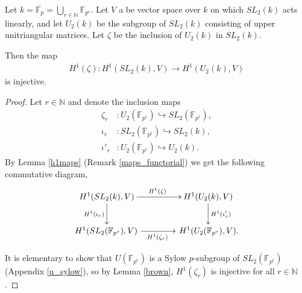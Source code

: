 \begin{example} \label{ab_example}
	Let $k = \overline{\mathbb{F}_p} = \bigcup_{r\in \mathbb{N}} \mathbb{F}_{p^r}$.
Let $V$ a be vector space over $k$ on which $SL_2(k)$ acts linearly, and let $U_2(k)$ be the subgroup of $SL_2(k)$ consisting of upper unitriangular matrices. Let $\zeta$ be the inclusion of $U_2(k)$ in $SL_2(k)$.

Then the map
	\begin{align}
		H^1(\zeta): H^1(SL_2(k), V) \rightarrow H^1(U_2(k), V)
	\end{align}
	is injective.
\label{eg:sl2ab}
\end{example}
\begin{proof}
	Let $r \in \mathbb{N}$ and denote the inclusion maps
\begin{align*}
	\zeta_r&:U_2(\mathbb{F}_{p^r}) \hookrightarrow SL_2(\mathbb{F}_{p^r}), \\
	\iota_r&:SL_2(\mathbb{F}_{p^r}) \hookrightarrow SL_2(k), \\
	\iota'_r&:U_2(\mathbb{F}_{p^r}) \hookrightarrow U_2(k).
\end{align*}
By Lemma \ref{h1maps} (Remark \ref{maps_functorial}) we get the following commutative diagram,
\begin{align}\label{eqn:cd}
	\xymatrix@C=40pt{
		H^1(SL_2(k), V) \ar[r]^{H^1(\zeta)} \ar[d]_{H^1(\iota_r)} & H^1(U_2(k), V) \ar[d]^{H^1(\iota'_r)} \\
		H^1(SL_2(\mathbb{F}_{p^r}), V)\, \ar[r]_{H^1(\zeta_r)} &\, H^1(U_2(\mathbb{F}_{p^r}), V).
	}
\end{align}

It is elementary to show that $U(\mathbb{F}_{p^r})$ is a Sylow $p$-subgroup of $SL_2(\mathbb{F}_{p^r})$ (Appendix \ref{u_sylow}), so by Lemma \ref{brown}, $H^1(\zeta_r)$ is injective for all $r \in \mathbb{N}$.


\end{proof}
